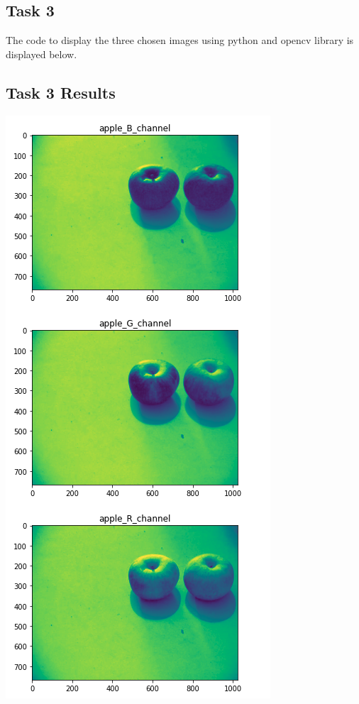 \documentclass{article}
\begin{document}
\begin{multicols}{2}
\section{Task 3}

The code to display the three chosen images using python and opencv library is displayed below.

\subsection{Task 3 Results}

\centering
{}
\includegraphics[scale=0.3]{../screenshots/RGB_1.png}


\end{multicols}
\end{document}
